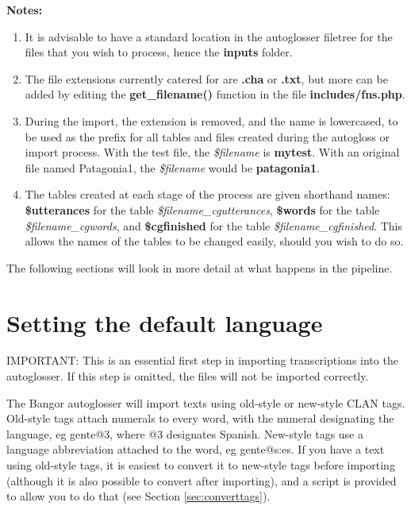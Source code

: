 \documentclass[a4paper,10pt]{article}
\begin{document}
\textbf{Notes:}
\begin{enumerate}
\item It is advisable to have a standard location in the autoglosser filetree for the files that you wish to process, hence the \textbf{inputs} folder. 

\item The file extensions currently catered for are \textbf{.cha} or \textbf{.txt}, but more can be added by editing the \textbf{get\_filename()} function in the file \textbf{includes/fns.php}.

\item During the import, the extension is removed, and the name is lowercased, to be used as the  prefix for all tables and files created during the autogloss or import process.  With the test file, the \textit{\$filename} is \textbf{mytest}.  With an original file named Patagonia1, the \textit{\$filename} would be \textbf{patagonia1}.

\item The tables created at each stage of the process are given shorthand names: \textbf{\$utterances} for the table \textit{\$filename\_cgutterances}, \textbf{\$words} for the table \textit{\$filename\_cgwords}, and \textbf{\$cgfinished} for the table \textit{\$filename\_cgfinished}.  This allows the names of the tables to be changed easily, should you wish to do so.
\end{enumerate}

The following sections will look in more detail at what happens in the pipeline.


\section{Setting the default language}
\label{sec:defaultlg}

IMPORTANT: This is an essential first step in importing transcriptions into the autoglosser.  If this step is omitted, the files will not be imported correctly.

The Bangor autoglosser will import texts using old-style or new-style CLAN tags.  Old-style tags attach numerals to every word, with the numeral designating the language, eg gente@3, where @3 designates Spanish.  New-style tags use a language abbreviation attached to the word, eg gente@s:es.  If you have a text using old-style tags, it is easiest to convert it to new-style tags before importing (although it is also possible to convert after importing), and a script is provided to allow you to do that (see Section \ref{sec:converttags}).  
\end{document}
